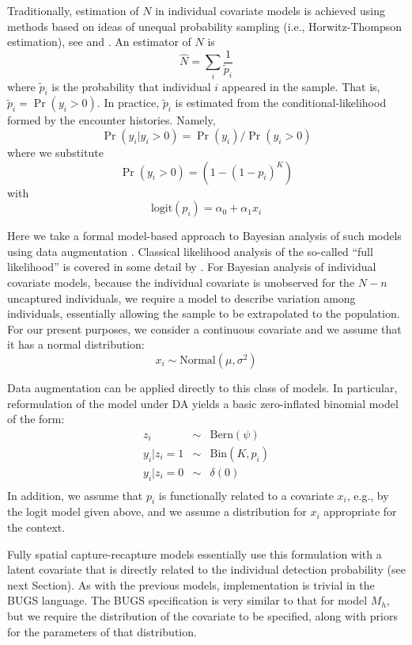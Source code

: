 Traditionally, estimation of $N$ in individual covariate models is
achieved using methods based on ideas of unequal probability sampling
(i.e., Horwitz-Thompson estimation), see \citet{huggins:1989} and
\citet{alho:1990}. An estimator of $N$ is
\[
\hat{N} = \sum_{i} \frac{1}{\tilde{p}_{i}}
\]
where $\tilde{p}_{i}$ is the probability that individual $i$ appeared
in the sample.  That is, $\tilde{p}_{i} = \Pr(y_{i}>0)$.  In practice,
$\tilde{p}_{i}$ is estimated from the conditional-likelihood formed by
the encounter histories. Namely,
\[
\Pr(y_{i}|y_{i}>0) = \Pr(y_{i})/\Pr(y_{i}>0)
\]
where we substitute
\[
\Pr(y_{i}>0) = (1- (1-p_{i})^K) 
\]
with 
\[
\mbox{logit}(p_{i}) = \alpha_{0} + \alpha_{1} x_{i}
\]

Here we take a formal model-based approach to Bayesian analysis of
such models using data augmentation \citep{royle:2009}. Classical
likelihood analysis of the so-called ``full likelihood'' is covered in
some detail by \citet{borchers_etal:2002}.  For Bayesian analysis of
individual covariate models, because the individual covariate is
unobserved for the $N-n$ uncaptured individuals, we require a model to
describe variation among individuals, essentially allowing the sample
to be extrapolated to the population.  For our present purposes, we
consider a continuous covariate and we assume that it has a normal
distribution:
\[
x_{i} \sim \mbox{Normal}(\mu,\sigma^{2})
\]

Data augmentation can be applied directly to this class of models. In
particular, reformulation of the model under DA yields a basic
zero-inflated binomial model of the form:
\begin{eqnarray*}
z_{i} &\sim& \mbox{Bern}(\psi) \\
y_{i}|{z_{i}\! =\! 1} &\sim& \mbox{Bin}(K,p_{i}) \\
y_{i} |{ z_{i}\! =\! 0} &\sim& \delta(0)  \\
\end{eqnarray*}
In addition, we assume that $p_{i}$ is functionally related to a
covariate $x_{i}$, e.g., by the logit model given above, and we assume
a distribution for $x_i$ appropriate for the context.

Fully spatial capture-recapture models essentially use this
formulation with a latent covariate that is directly related to the
individual detection probability (see next Section). As with the
previous models, implementation is trivial in the BUGS language. The
BUGS specification is very similar to that for model $M_h$, but we
require the distribution of the covariate to be specified, along with
priors for the parameters of that distribution.


